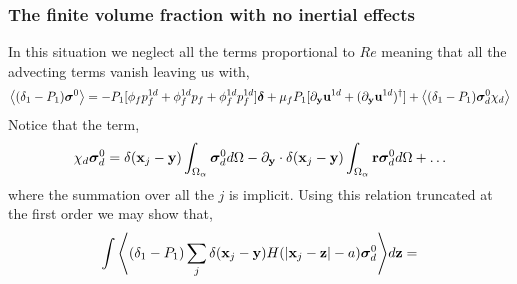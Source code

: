 \subsubsection{The finite volume fraction with no inertial effects}
In this situation we neglect all the terms proportional to $Re$ meaning that all the advecting terms vanish leaving us with, 
\begin{align*}
    \left<(\delta_1 - P_1)\bm\sigma^0\right>
    = 
    - P_1 [
        \phi_f p_f^{1d}
        +\phi_f^{1d} p_f
        +\phi_f^{1d} p_f^{1d}
    ] \bm\delta
    +\mu_fP_1[{\partial_\textbf{y}} \textbf{u}^{1d}+ ({\partial_\textbf{y}}\textbf{u}^{1d})^\dagger]
    + \left<(\delta_1 - P_1)\bm\sigma_d^0\chi_d\right>
\end{align*}
Notice that the term, 
\begin{equation*}
    \chi_d \bm\sigma_d^0
    = \delta(\textbf{x}_j - \textbf{y})\int_{\Omega_\alpha} \bm\sigma_d^0 d\Omega
    -{\partial_\textbf{y}} \cdot \delta(\textbf{x}_j - \textbf{y})\int_{\Omega_\alpha}  \textbf{r} \bm\sigma_d^0 d\Omega
    + \ldots
\end{equation*}
where the summation over all the $j$ is implicit. 
Using this relation truncated at the first order we may show that, 
\begin{equation*}
    \int{\left<(\delta_1 - P_1)\sum_j \delta(\textbf{x}_j - \textbf{y})H(|\textbf{x}_j - \textbf{z}| - a)\bm\sigma_d^0\right>}d\textbf{z}
    = 
\end{equation*}
